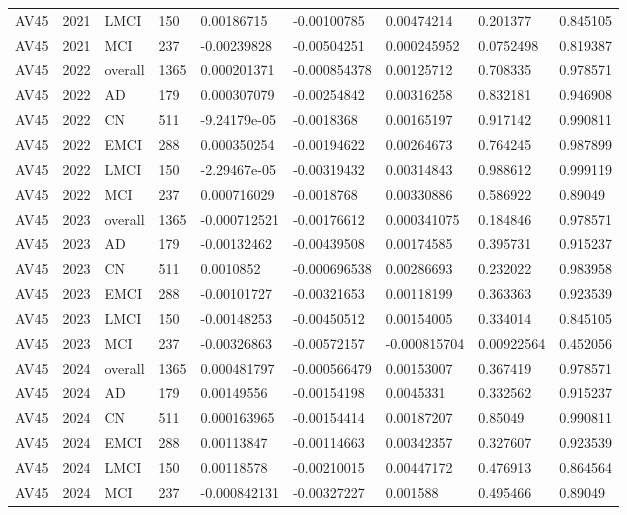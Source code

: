 \begin{landscape}
\begin{longtable}{lllllllll}
AV45 & 2021 & LMCI & 150 & 0.00186715 & -0.00100785 & 0.00474214 & 0.201377 & 0.845105 \\
AV45 & 2021 & MCI & 237 & -0.00239828 & -0.00504251 & 0.000245952 & 0.0752498 & 0.819387 \\
AV45 & 2022 & overall & 1365 & 0.000201371 & -0.000854378 & 0.00125712 & 0.708335 & 0.978571 \\
AV45 & 2022 & AD & 179 & 0.000307079 & -0.00254842 & 0.00316258 & 0.832181 & 0.946908 \\
AV45 & 2022 & CN & 511 & -9.24179e-05 & -0.0018368 & 0.00165197 & 0.917142 & 0.990811 \\
AV45 & 2022 & EMCI & 288 & 0.000350254 & -0.00194622 & 0.00264673 & 0.764245 & 0.987899 \\
AV45 & 2022 & LMCI & 150 & -2.29467e-05 & -0.00319432 & 0.00314843 & 0.988612 & 0.999119 \\
AV45 & 2022 & MCI & 237 & 0.000716029 & -0.0018768 & 0.00330886 & 0.586922 & 0.89049 \\
AV45 & 2023 & overall & 1365 & -0.000712521 & -0.00176612 & 0.000341075 & 0.184846 & 0.978571 \\
AV45 & 2023 & AD & 179 & -0.00132462 & -0.00439508 & 0.00174585 & 0.395731 & 0.915237 \\
AV45 & 2023 & CN & 511 & 0.0010852 & -0.000696538 & 0.00286693 & 0.232022 & 0.983958 \\
AV45 & 2023 & EMCI & 288 & -0.00101727 & -0.00321653 & 0.00118199 & 0.363363 & 0.923539 \\
AV45 & 2023 & LMCI & 150 & -0.00148253 & -0.00450512 & 0.00154005 & 0.334014 & 0.845105 \\
AV45 & 2023 & MCI & 237 & -0.00326863 & -0.00572157 & -0.000815704 & 0.00922564 & 0.452056 \\
AV45 & 2024 & overall & 1365 & 0.000481797 & -0.000566479 & 0.00153007 & 0.367419 & 0.978571 \\
AV45 & 2024 & AD & 179 & 0.00149556 & -0.00154198 & 0.0045331 & 0.332562 & 0.915237 \\
AV45 & 2024 & CN & 511 & 0.000163965 & -0.00154414 & 0.00187207 & 0.85049 & 0.990811 \\
AV45 & 2024 & EMCI & 288 & 0.00113847 & -0.00114663 & 0.00342357 & 0.327607 & 0.923539 \\
AV45 & 2024 & LMCI & 150 & 0.00118578 & -0.00210015 & 0.00447172 & 0.476913 & 0.864564 \\
AV45 & 2024 & MCI & 237 & -0.000842131 & -0.00327227 & 0.001588 & 0.495466 & 0.89049 \\

\end{longtable}
\end{landscape}
